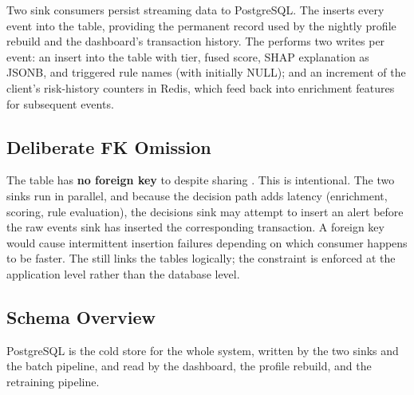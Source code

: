 Two sink consumers persist streaming data to PostgreSQL. The  inserts every event into the  table, providing the permanent record used by the nightly profile rebuild and the dashboard's transaction history. The  performs two writes per event: an insert into the  table with tier, fused score, SHAP explanation as JSONB, and triggered rule names (with  initially NULL); and an increment of the client's risk-history counters in Redis, which feed back into enrichment features for subsequent events.

\subsection{Deliberate FK Omission}

The  table has \textbf{no foreign key} to  despite sharing . This is intentional. The two sinks run in parallel, and because the decision path adds latency (enrichment, scoring, rule evaluation), the decisions sink may attempt to insert an alert before the raw events sink has inserted the corresponding transaction. A foreign key would cause intermittent insertion failures depending on which consumer happens to be faster. The  still links the tables logically; the constraint is enforced at the application level rather than the database level.

\subsection{Schema Overview}

PostgreSQL is the cold store for the whole system, written by the two sinks and the batch pipeline, and read by the dashboard, the profile rebuild, and the retraining pipeline.

